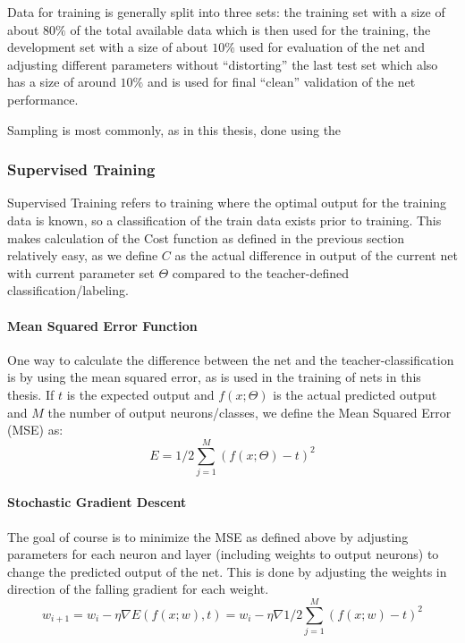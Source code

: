 Data for training is generally split into three sets: the training set with a size of about \(80\%\) of the total available data which is then used for the training, the development set with a size of about \(10\%\) used for evaluation of the net and adjusting different parameters without ``distorting'' the last test set which also has a size of around \(10\%\) and is used for final ``clean'' validation of the net performance.

Sampling is most commonly, as in this thesis, done using the 

\subsubsection{Supervised Training}
\label{sec:fund:ST}
Supervised Training refers to training where the optimal output for the training data is known, so a classification of the train data exists prior to training. This makes calculation of the Cost function as defined in the previous section relatively easy, as we define \(C\) as the actual difference in output of the current net with current parameter set \(\Theta\) compared to the teacher-defined classification/labeling. 

\paragraph{Mean Squared Error Function}

One way to calculate the difference between the net and the teacher-classification is by using the mean squared error, as is used in the training of nets in this thesis. If  \(t\) is the expected output and \(f(x;\Theta)\) is the actual predicted output and \(M\) the number of output neurons/classes, we define the Mean Squared Error (MSE) as:
\begin{equation}
E = 1 / 2 \sum_{j=1}^{M}(f(x;\Theta) - t)^2
\end{equation}

\paragraph{Stochastic Gradient Descent} The goal of course is to minimize the MSE as defined above by adjusting parameters for each neuron and layer (including weights to output neurons) to change the predicted output of the net.  This is done by adjusting the weights in direction of the falling gradient for each weight.
\begin{equation}
w_{i+1} = w_i - \eta \nabla E(f(x;w), t) = w_i - \eta \nabla 1/2\sum_{j=1}^M(f(x;w) - t)^2
\end {equation}

